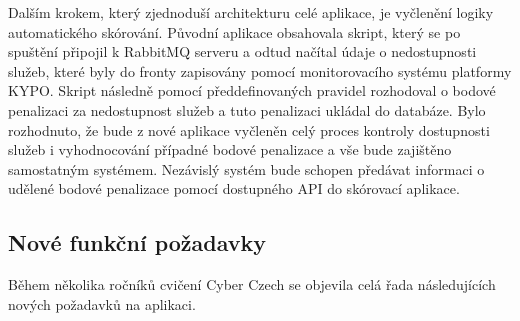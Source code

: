 \documentclass[
  digital,
  twoside,
  table, 
  nolof, 
  nolot
]{fithesis3}
\begin{document}
Dalším krokem, který zjednoduší architekturu celé aplikace, je vyčlenění logiky automatického skórování. Původní aplikace obsahovala skript, který se po spuštění připojil k RabbitMQ serveru a odtud načítal údaje o nedostupnosti služeb, které byly do fronty zapisovány pomocí monitorovacího systému platformy KYPO. Skript následně pomocí předdefinovaných pravidel rozhodoval o bodové penalizaci za nedostupnost služeb a tuto penalizaci ukládal do databáze. Bylo rozhodnuto, že bude z nové aplikace vyčleněn celý proces kontroly dostupnosti služeb i vyhodnocování případné bodové penalizace a vše bude zajištěno samostatným systémem. Nezávislý systém bude schopen předávat informaci o udělené bodové penalizace pomocí dostupného API do skórovací aplikace.

\subsection{Nové funkční požadavky}

Během několika ročníků cvičení Cyber Czech se objevila celá řada následujících nových požadavků na aplikaci.
\end{document}

